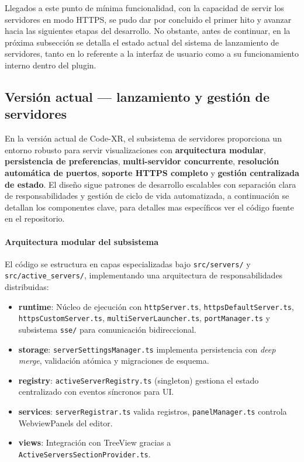 \documentclass[a4paper, 12pt]{book}
\begin{document}
Llegados a este punto de mínima funcionalidad, con la capacidad de servir los servidores en modo HTTPS, se pudo dar por concluido el primer hito y avanzar hacia las siguientes etapas del desarrollo. No obstante, antes de continuar, en la próxima subsección se detalla el estado actual del sistema de lanzamiento de servidores, tanto en lo referente a la interfaz de usuario como a su funcionamiento interno dentro del plugin.

\subsection{Versión actual — lanzamiento y gestión de servidores}
\label{sec:sprint-servers-current}

En la versión actual de Code-XR, el subsistema de servidores proporciona un entorno robusto para servir visualizaciones con \textbf{arquitectura modular}, \textbf{persistencia de preferencias}, \textbf{multi-servidor concurrente}, \textbf{resolución automática de puertos}, \textbf{soporte HTTPS completo} y \textbf{gestión centralizada de estado}. El diseño sigue patrones de desarrollo escalables con separación clara de responsabilidades y gestión de ciclo de vida automatizada, a continuación se detallan los componentes clave, para detalles mas específicos ver el código fuente en el repositorio\cite{code-xr}.

\paragraph{Arquitectura modular del subsistema}
El código se estructura en capas especializadas bajo \texttt{src/servers/} y \texttt{src/active\_servers/}, implementando una arquitectura de responsabilidades distribuidas:

\begin{itemize}
  \item \textbf{runtime}: Núcleo de ejecución con \texttt{httpServer.ts}, \texttt{httpsDefaultServer.ts}, \texttt{httpsCustomServer.ts}, \texttt{multiServerLauncher.ts}, \texttt{portManager.ts} y subsistema \texttt{sse/} para comunicación bidireccional.
  \item \textbf{storage}: \texttt{serverSettingsManager.ts} implementa persistencia con \emph{deep merge}, validación atómica y migraciones de esquema.
  \item \textbf{registry}: \texttt{activeServerRegistry.ts} (singleton) gestiona el estado centralizado con eventos síncronos para UI.
  \item \textbf{services}: \texttt{serverRegistrar.ts} valida registros, \texttt{panelManager.ts} controla WebviewPanels del editor.
  \item \textbf{views}: Integración con TreeView gracias a \texttt{ActiveServersSectionProvider.ts}.
\end{itemize}
\end{document}
